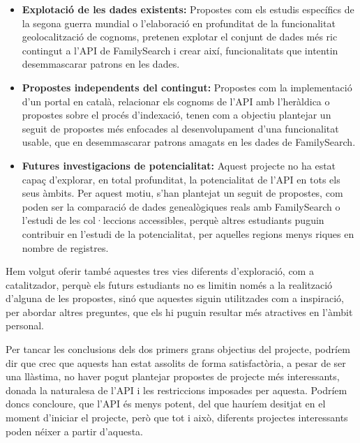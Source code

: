     \begin{itemize}
        \item \textbf{Explotació de les dades existents:} Propostes com els estudis específics de la segona guerra mundial o l’elaboració en profunditat de la funcionalitat geolocalització de cognoms, pretenen explotar el conjunt de dades més ric contingut a l’API de FamilySearch i crear així, funcionalitats que intentin desemmascarar patrons en les dades.
        \item \textbf{Propostes independents del contingut:} Propostes com la implementació d’un portal en català, relacionar els cognoms de l’API amb l’heràldica o propostes sobre el procés d’indexació, tenen com a objectiu plantejar un seguit de propostes més enfocades al desenvolupament d’una funcionalitat usable, que en desemmascarar patrons amagats en les dades de FamilySearch.
        \item \textbf{Futures investigacions de potencialitat:} Aquest projecte no ha estat capaç d’explorar, en total profunditat, la potencialitat de l’API en tots els seus àmbits. Per aquest motiu, s’han plantejat un seguit de propostes, com poden ser la comparació de dades genealògiques reals amb FamilySearch o l’estudi de les col·leccions accessibles, perquè altres estudiants puguin contribuir en l’estudi de la potencialitat, per aquelles regions menys riques en nombre de registres.
    \end{itemize}

    Hem volgut oferir també aquestes tres vies diferents d’exploració, com a cata\-lit\-zador, perquè els futurs estudiants no es limitin només a la realització d’alguna de les propostes, sinó que aquestes siguin utilitzades com a inspiració, per abordar altres preguntes, que els hi puguin resultar més atractives en l’àmbit personal.

    Per tancar les conclusions dels dos primers grans objectius del projecte, podríem dir que crec que aquests han estat assolits de forma satisfactòria, a pesar de ser una llàstima, no haver pogut plantejar propostes de projecte més interessants, donada la naturalesa de l’API i les restriccions imposades per aquesta. Podríem doncs concloure, que l’API és menys potent, del que hauríem desitjat en el moment d’iniciar el projecte, però que tot i això, diferents projectes interessants poden néixer a partir d’aquesta.
